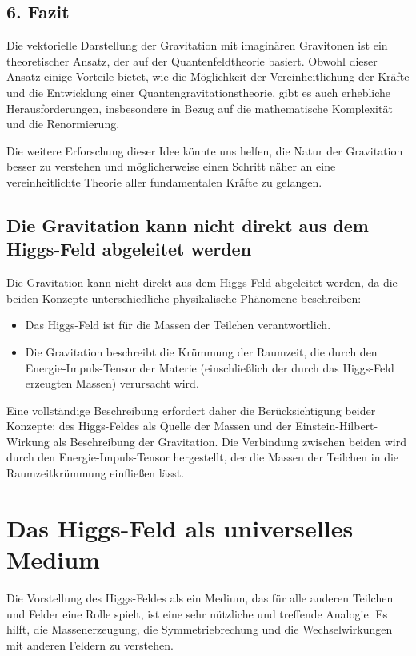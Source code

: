 \documentclass{article}
\begin{document}
\subsection{6. Fazit}

Die vektorielle Darstellung der Gravitation mit imaginären Gravitonen ist ein theoretischer Ansatz, der auf der Quantenfeldtheorie basiert. Obwohl dieser Ansatz einige Vorteile bietet, wie die Möglichkeit der Vereinheitlichung der Kräfte und die Entwicklung einer Quantengravitationstheorie, gibt es auch erhebliche Herausforderungen, insbesondere in Bezug auf die mathematische Komplexität und die Renormierung.

Die weitere Erforschung dieser Idee könnte uns helfen, die Natur der Gravitation besser zu verstehen und möglicherweise einen Schritt näher an eine vereinheitlichte Theorie aller fundamentalen Kräfte zu gelangen.

\subsection{Die Gravitation kann nicht direkt aus dem Higgs-Feld abgeleitet werden}

Die Gravitation kann nicht direkt aus dem Higgs-Feld abgeleitet werden, da die beiden Konzepte unterschiedliche physikalische Phänomene beschreiben:

\begin{itemize}
	\item Das Higgs-Feld ist für die Massen der Teilchen verantwortlich.
	\item Die Gravitation beschreibt die Krümmung der Raumzeit, die durch den Energie-Impuls-Tensor der Materie (einschließlich der durch das Higgs-Feld erzeugten Massen) verursacht wird.
\end{itemize}

Eine vollständige Beschreibung erfordert daher die Berücksichtigung beider Konzepte: des Higgs-Feldes als Quelle der Massen und der Einstein-Hilbert-Wirkung als Beschreibung der Gravitation. Die Verbindung zwischen beiden wird durch den Energie-Impuls-Tensor hergestellt, der die Massen der Teilchen in die Raumzeitkrümmung einfließen lässt.

\section{Das Higgs-Feld als universelles Medium}

Die Vorstellung des Higgs-Feldes als ein Medium, das für alle anderen Teilchen und Felder eine Rolle spielt, ist eine sehr nützliche und treffende Analogie. Es hilft, die Massenerzeugung, die Symmetriebrechung und die Wechselwirkungen mit anderen Feldern zu verstehen.
\end{document}
